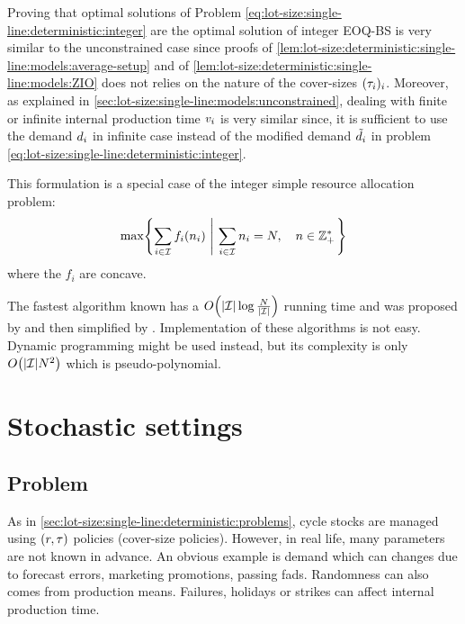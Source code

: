 Proving that optimal solutions of Problem \eqref{eq:lot-size:single-line:deterministic:integer} are the optimal solution of integer EOQ-BS is very similar to the unconstrained case since proofs of \cref{lem:lot-size:deterministic:single-line:models:average-setup} and of \cref{lem:lot-size:deterministic:single-line:models:ZIO} does not relies on the nature of the cover-sizes $\bracket{\cover_i}_i$.
Moreover, as explained in \cref{sec:lot-size:single-line:models:unconstrained}, dealing with finite or infinite internal production time $v_i$ is very similar since, it is sufficient to use the demand $d_i$ in infinite case instead of the modified demand $\tilde{d}_i$ in problem \eqref{eq:lot-size:single-line:deterministic:integer}.


\medskip


This formulation is a special case of the integer simple resource allocation problem:
\begin{equation}
  \max\crbracket{\sum_{i\in\REF} f_i\bracket{\freq_i}\ \left|\ \sum_{i\in\REF}\freq_i=\nbsetups,\quad\freq\in \ZZ_+^*\right.}
\end{equation}
where the $f_i$ are concave.


The fastest algorithm known has a $O\bracket{\card{\REF}\log{\frac{\nbsetups}{\card{\REF}}}}$ running time and was proposed by \cite{Frederickson1982} and then simplified by \cite{Hochbaum1994}.
Implementation of these algorithms is not easy.
Dynamic programming might be used instead, but its complexity is only $O\bracket{\card{\REF}\nbsetups^2}$ which is pseudo-polynomial.



\section{Stochastic settings}


\subsection{Problem}
\label{sec:lot-size:single-line:stochastic:problem}


As in \cref{sec:lot-size:single-line:deterministic:problems}, cycle stocks are managed using $(r,\tau)$ policies (\ie cover-size policies).
However, in real life, many parameters are not known in advance.
An obvious example is demand which can changes due to forecast errors, marketing promotions, passing fads.
Randomness can also comes from production means.
Failures, holidays or strikes can affect internal production time.


